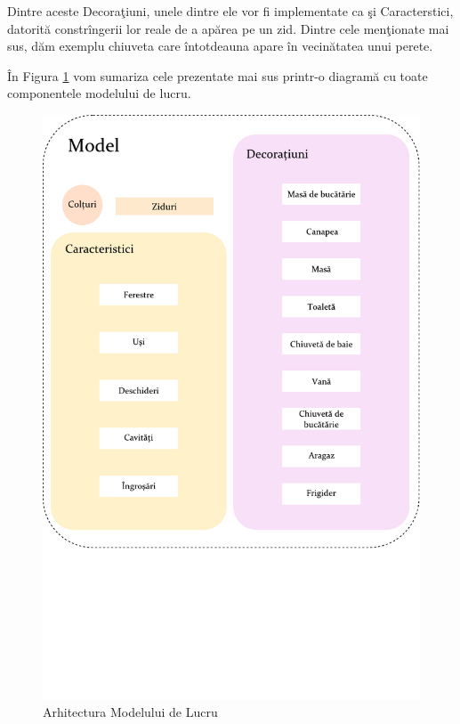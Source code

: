 Dintre aceste Decoraţiuni, unele dintre ele vor fi implementate ca şi 
Caracterstici, datorită constrîngerii lor reale de a apărea pe un zid. Dintre 
cele menţionate mai sus, dăm exemplu chiuveta care întotdeauna apare în 
vecinătatea unui perete.

În Figura \ref{figure:model-arh} vom sumariza cele prezentate mai sus printr-o 
diagramă cu toate componentele modelului de lucru.

\begin{figure}[htp]
\begin{center} 
\includegraphics[width=\textwidth]{figures/drawing.pdf} \caption{Arhitectura 
Modelului de Lucru}
  \label{figure:model-arh}
\end{center}
\end{figure}

